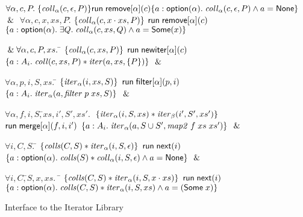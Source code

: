 \begin{figure}
\begin{specification}

\> $\forall \alpha, c, P.\; \{{\mathit{coll}_\alpha(c, \epsilon, P)}\}{\mathsf{run}\;{\mathsf{remove}[\alpha](c)}}\{{a:\mathsf{option }{(\alpha)}}.\;{\mathit{coll}_\alpha(c, \epsilon, P) \land a = \mathsf{None}}\}$
$\;\&\;$ 
\> $\forall \alpha, c, x, xs, P.$\=
          $\{{\mathit{coll}_\alpha(c, x\cdot xs, P)}\}$ 
\nextline
\>\> $\mathsf{run}\;{\mathsf{remove}[\alpha](c)}$ 
\nextline
\>\> $\{{a:\mathsf{option }{(\alpha)}.\;
             \exists Q.\;\mathit{coll}_\alpha(c, xs, Q) \land a = \mathsf{Some}(x)}\}$ 

\> $\;\&\; \forall \alpha, c, P, xs.\;$\=
            $\{{\mathit{coll}_\alpha(c, xs, P)}\}$ 
\nextline
\>\>$\mathsf{run}\;{\mathsf{newiter}[\alpha](c)}$
\nextline
\>\>$\{{a:A_i.\; \mathit{coll}(c, xs, P) * \mathit{iter}(a, xs, \{{P}\})}\}$ $\;\&\;$ 

 \> $\forall \alpha, p, i, S, xs.\;$\=
         $\{{\mathit{iter}_\alpha(i, xs, S)}\}$ 
\nextline
\>\>   $\mathsf{run}\;{\mathsf{filter}[\alpha](p, i)}$
\nextline
\>\>   $\{{a:A_i.\; \mathit{iter}_\alpha(a, \mathit{filter}\; p\;xs, S)}\}$ $\;\&\;$ 

 \> $\forall \alpha, f, i, S,$\=$ xs, i', S', xs'.\;$ 
\nextline
 \> \> 
     $\{{\mathit{iter}_\alpha(i, S, xs) * \mathit{iter}_\beta(i', S', xs')}\}$ 
\nextline
 \> \> $\mathsf{run}\;{\mathsf{merge}[\alpha](f, i, i')}$ 
\nextline
 \> \> $\{{a:A_i.\; \mathit{iter}_{\alpha}(a, S \cup S', \mathit{map2}\;f\;xs\;xs')}\}$ $\;\&\;$ 

 \> $\forall i, C, S.\;$\=
      $\{{\mathit{colls}(C, S) * \mathit{iter}_\alpha(i, S, \epsilon)}\}$
\nextline  
\>\>$\mathsf{run}\;{\mathsf{next}(i)}$ 
\nextline
\>\>$\{{a:\mathsf{option }{(\alpha)}.\; \mathit{colls}(S) * \mathit{coll}_\alpha(i, S, \epsilon) \land a = \mathsf{None}}\}$ $\;\&\;$ 

 \> $\forall i,C, $\=$ S, x, xs.\;$ \= 
      $\{{\mathit{colls}(C, S) * \mathit{iter}_\alpha(i, S, x \cdot xs)}\}$
\nextline
\>\>\>$\mathsf{run}\;{\mathsf{next}(i)}$
\nextline
\>\>\>$\{{a:\mathsf{option }{(\alpha)}.\; 
              \mathit{colls}(C, S) * \mathit{iter}_\alpha(i, S, xs) \land a = (\mathsf{Some}\;x)}\}$ 

\end{specification}
\caption{Interface to the Iterator Library}
\label{iterator-interface}
\end{figure}

